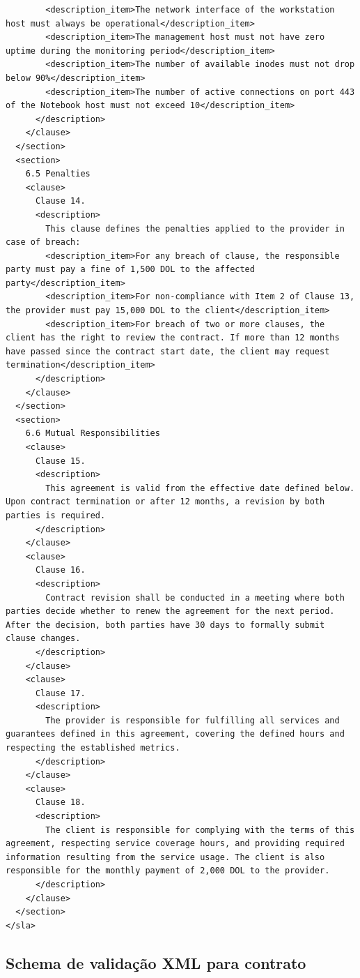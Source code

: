 \documentclass[12pt]{article}
\begin{document}
\begin{lstlisting}
        <description_item>The network interface of the workstation host must always be operational</description_item>
        <description_item>The management host must not have zero uptime during the monitoring period</description_item>
        <description_item>The number of available inodes must not drop below 90%</description_item>
        <description_item>The number of active connections on port 443 of the Notebook host must not exceed 10</description_item>
      </description>
    </clause>
  </section>
  <section>
    6.5 Penalties
    <clause>
      Clause 14.
      <description>
        This clause defines the penalties applied to the provider in case of breach:
        <description_item>For any breach of clause, the responsible party must pay a fine of 1,500 DOL to the affected party</description_item>
        <description_item>For non-compliance with Item 2 of Clause 13, the provider must pay 15,000 DOL to the client</description_item>
        <description_item>For breach of two or more clauses, the client has the right to review the contract. If more than 12 months have passed since the contract start date, the client may request termination</description_item>
      </description>
    </clause>
  </section>
  <section>
    6.6 Mutual Responsibilities
    <clause>
      Clause 15.
      <description>
        This agreement is valid from the effective date defined below. Upon contract termination or after 12 months, a revision by both parties is required.
      </description>
    </clause>
    <clause>
      Clause 16.
      <description>
        Contract revision shall be conducted in a meeting where both parties decide whether to renew the agreement for the next period. After the decision, both parties have 30 days to formally submit clause changes.
      </description>
    </clause>
    <clause>
      Clause 17.
      <description>
        The provider is responsible for fulfilling all services and guarantees defined in this agreement, covering the defined hours and respecting the established metrics.
      </description>
    </clause>
    <clause>
      Clause 18.
      <description>
        The client is responsible for complying with the terms of this agreement, respecting service coverage hours, and providing required information resulting from the service usage. The client is also responsible for the monthly payment of 2,000 DOL to the provider.
      </description>
    </clause>
  </section>
</sla>
\end{lstlisting}

\subsection{Schema de validação XML para contrato}\label{sec:sla}
\end{document}
